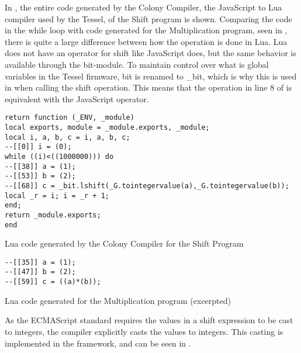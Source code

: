 In , the entire code generated by the Colony Compiler, the JavaScript to Lua compiler used by the Tessel, of the Shift program is shown.
Comparing the code in the while loop with code generated for the Multiplication program, seen in , there is quite a large difference between how the operation is done in Lua.
Lua does not have an operator for shift like JavaScript does, but the same behavior is available through the bit-module.
To maintain control over what is global variables in the Tessel firmware, bit is renamed to \_bit, which is why this is used in when calling the shift operation.
This means that the operation in line 8 of  is equivalent with the JavaScript operator.

\begin{listing}[ht]
\begin{verbatim}
return function (_ENV, _module)
local exports, module = _module.exports, _module;
local i, a, b, c = i, a, b, c;
--[[0]] i = (0); 
while ((i)<((1000000))) do 
--[[38]] a = (1); 
--[[53]] b = (2); 
--[[68]] c = _bit.lshift(_G.tointegervalue(a),_G.tointegervalue(b)); 
local _r = i; i = _r + 1;
end;
return _module.exports;
end 
\end{verbatim}
\caption{Lua code generated by the Colony Compiler for the Shift Program}
\label{lst:shifttrans}
\end{listing}

\begin{listing}[ht]
\centering
\begin{verbatim}
--[[35]] a = (1); 
--[[47]] b = (2); 
--[[59]] c = ((a)*(b)); 
\end{verbatim}
\caption{Lua code generated for the Multiplication program (excerpted)}
\label{lst:multtrans}
\end{listing}

As the ECMAScript standard requires the values in a shift expression to be cast to integers, the compiler explicitly casts the values to integers. \citep[section 11.7.1]{ecmascript5}
This casting is implemented in the framework, and can be seen in .

